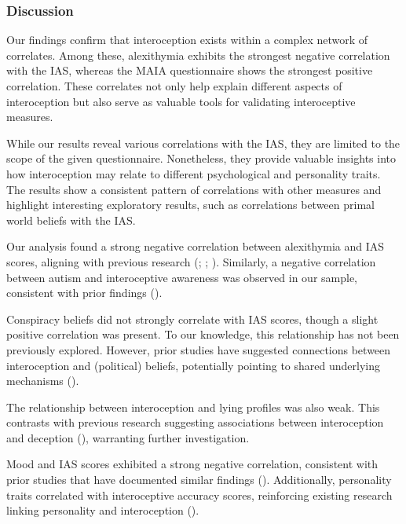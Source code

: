 \documentclass[
  man,
  floatsintext,
  longtable,
  nolmodern,
  notxfonts,
  notimes,
  colorlinks=true,linkcolor=blue,citecolor=blue,urlcolor=blue]{apa7}
\begin{document}
\subsubsection{Discussion}\label{discussion-1}

Our findings confirm that interoception exists within a complex network
of correlates. Among these, alexithymia exhibits the strongest negative
correlation with the IAS, whereas the MAIA questionnaire shows the
strongest positive correlation. These correlates not only help explain
different aspects of interoception but also serve as valuable tools for
validating interoceptive measures.

While our results reveal various correlations with the IAS, they are
limited to the scope of the given questionnaire. Nonetheless, they
provide valuable insights into how interoception may relate to different
psychological and personality traits. The results show a consistent
pattern of correlations with other measures and highlight interesting
exploratory results, such as correlations between primal world beliefs
with the IAS.

Our analysis found a strong negative correlation between alexithymia and
IAS scores, aligning with previous research
(;
;
). Similarly, a negative
correlation between autism and interoceptive awareness was observed in
our sample, consistent with prior findings
().

Conspiracy beliefs did not strongly correlate with IAS scores, though a
slight positive correlation was present. To our knowledge, this
relationship has not been previously explored. However, prior studies
have suggested connections between interoception and (political)
beliefs, potentially pointing to shared underlying mechanisms
().

The relationship between interoception and lying profiles was also weak.
This contrasts with previous research suggesting associations between
interoception and deception (), warranting further investigation.

Mood and IAS scores exhibited a strong negative correlation, consistent
with prior studies that have documented similar findings
().
Additionally, personality traits correlated with interoceptive accuracy
scores, reinforcing existing research linking personality and
interoception ().
\end{document}
